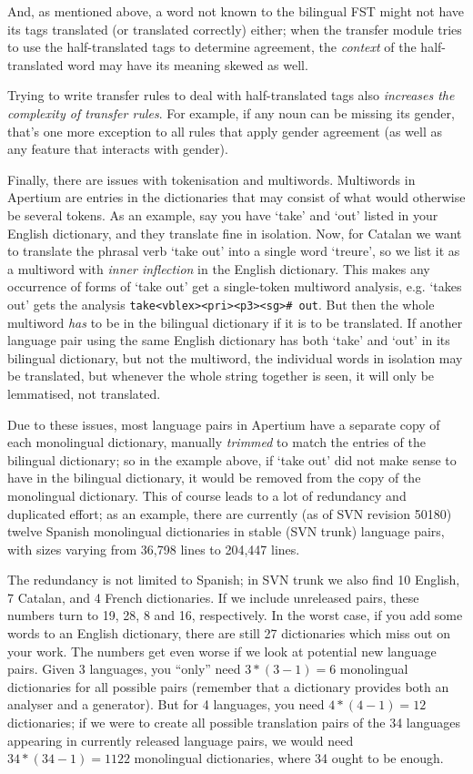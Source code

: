 \documentclass[10pt, a4paper]{article}
\newcommand{\ana}[1]{\texttt{#1}}
\newcommand{\f}[1]{`#1'}
\begin{document}
And, as mentioned above, a word not known to the bilingual FST might not
have its tags translated (or translated correctly) either; when the
transfer module tries to use the half-translated tags to determine
agreement, the \emph{context} of the half-translated word may have its
meaning skewed as well.

Trying to write transfer rules to deal with half-translated tags also
\emph{increases the complexity of transfer rules}. For example, if any
noun can be missing its gender, that's one more exception to all rules
that apply gender agreement (as well as any feature that interacts with
gender).

Finally, there are issues with tokenisation and multiwords.
Multiwords in Apertium are entries in the dictionaries that may
consist of what would otherwise be several tokens. As an example, say
you have \f{take} and \f{out} listed in your English dictionary, and
they translate fine in isolation. Now, for Catalan we want to
translate the phrasal verb \f{take out} into a single word \f{treure},
so we list it as a multiword with \emph{inner inflection} in the
English dictionary. This makes any occurrence of forms of \f{take out}
get a single-token multiword analysis, e.g. \f{takes out} gets the
analysis \ana{take<vblex><pri><p3><sg>\# out}. But then the whole multiword
\emph{has} to be in the bilingual dictionary if it is to be
translated. If another language pair using the same English dictionary
has both \f{take} and \f{out} in its bilingual dictionary, but not the
multiword, the individual words in isolation may be translated, but
whenever the whole string together is seen, it will only be
lemmatised, not translated.

Due to these issues, most language pairs in Apertium have a separate
copy of each monolingual dictionary, manually \emph{trimmed} to match
the entries of the bilingual dictionary; so in the example above, if
\f{take out} did not make sense to have in the bilingual dictionary,
it would be removed from the copy of the monolingual dictionary. This
of course leads to a lot of redundancy and duplicated effort; as an
example, there are currently (as of SVN revision 50180) twelve Spanish
monolingual dictionaries in stable (SVN trunk) language pairs, with
sizes varying from 36,798 lines to 204,447 lines.

The redundancy is not limited to Spanish; in SVN trunk we also find 10
English, 7 Catalan, and 4 French dictionaries. If we include
unreleased pairs, these numbers turn to 19, 28, 8 and 16,
respectively.
In the worst case, if you add some words to an English dictionary,
there are still 27 dictionaries which miss out on your work.  The
numbers get even worse if we look at potential new language pairs.
Given 3 languages, you ``only'' need $3*(3-1)=6$ monolingual
dictionaries for all possible pairs (remember that a dictionary
provides both an analyser and a generator). But for 4 languages, you
need $4*(4-1)=12$ dictionaries; if we were to  create all possible
translation pairs of the 34 languages appearing in currently released
language pairs, we would need $34*(34-1)=1122$ monolingual dictionaries,
where 34 ought to be enough.
\end{document}
